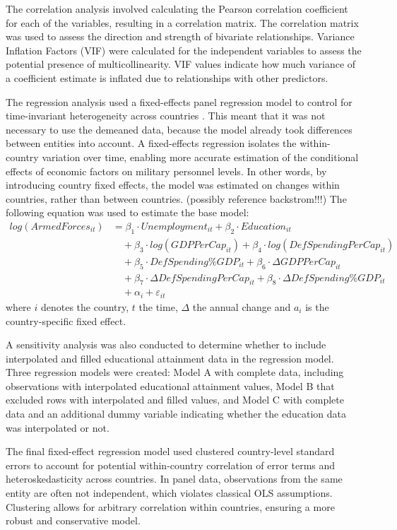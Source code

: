 The correlation analysis involved calculating the Pearson correlation coefficient for each 
of the variables, resulting in a correlation matrix. The correlation matrix was used to assess the 
direction and strength of bivariate relationships.
Variance Inflation Factors (VIF) were calculated for the independent variables to 
assess the potential presence of multicollinearity. VIF values indicate how much variance
of a coefficient estimate is inflated due to relationships with other predictors.

The regression analysis used a fixed-effects panel regression model to control for time-invariant 
heterogeneity across countries \parencite{backstrom_are_2019}. This meant that it was not 
necessary to 
use the demeaned data, because the model already took differences between entities into account.
A fixed-effects regression isolates the within-country variation over time, enabling more accurate 
estimation of the conditional effects of economic factors on military personnel levels.
In other words, by introducing country fixed effects, the model was estimated on changes within 
countries, rather than between countries. (possibly reference backstrom!!!) 
The following equation was used to estimate the base model:
\begin{align*}
log(ArmedForces_{it}) &= \beta_1 \cdot Unemployment_{it} 
+ \beta_2 \cdot Education_{it} \\
&\quad + \beta_3 \cdot log(GDPPerCap_{it}) 
+ \beta_4 \cdot log(DefSpendingPerCap_{it}) \\
&\quad + \beta_5 \cdot DefSpending\%GDP_{it} 
+ \beta_6 \cdot \Delta GDPPerCap_{it} \\
&\quad + \beta_7 \cdot \Delta DefSpendingPerCap_{it} 
+ \beta_8 \cdot \Delta DefSpending\%GDP_{it} \\
&\quad + \alpha_i + \varepsilon_{it}
\end{align*}
where $i$ denotes the country, $t$ the time, $\Delta$ the annual change and 
$a_i$ is the country-specific fixed effect.

A sensitivity analysis was also conducted to determine whether to include interpolated and filled educational 
attainment data in the regression model. Three regression models were created: Model A with 
complete data, including observations with interpolated educational attainment values, Model B 
that excluded rows with interpolated and filled values, and Model C with complete data and an additional 
dummy variable indicating whether the education data was interpolated or not.

The final fixed-effect regression model used clustered country-level standard errors to 
account for potential within-country correlation of error terms and heteroskedasticity across 
countries. In panel data, observations from the same entity are often not independent, which 
violates classical OLS assumptions. Clustering allows for arbitrary correlation within 
countries, ensuring a more robust and conservative model.